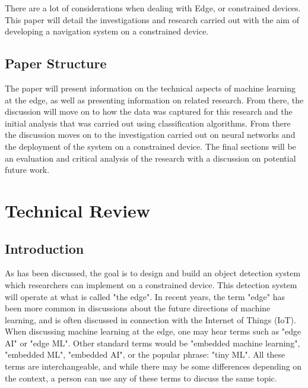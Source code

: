 \documentclass[conference]{IEEEtran}
\begin{document}
There are a lot of considerations when dealing with Edge, or constrained devices. This paper will detail the investigations and research carried out with the aim of developing a navigation system on a constrained device.

\subsection{Paper Structure}
The paper will present information on the technical aspects of machine learning at the edge, as well as presenting information on related research. From there, the discussion will move on to how the data was captured for this research and the initial analysis that was carried out using classification algorithms. From there the discussion moves on to the investigation carried out on neural networks and the deployment of the system on a constrained device. The final sections will be an evaluation and critical analysis of the research with a discussion on potential future work.

\section{Technical Review}
\subsection{Introduction}
As has been discussed, the goal is to design and build an object detection system which researchers can implement on a constrained device. This detection system will operate at what is called "the edge". In recent years, the term "edge" has been more common in discussions about the future directions of machine learning, and is often discussed in connection with the Internet of Things (IoT). When discussing machine learning at the edge, one may hear terms such as "edge AI" or "edge ML". Other standard terms would be "embedded machine learning", "embedded ML", "embedded AI", or the popular phrase: "tiny ML". All these terms are interchangeable, and while there may be some differences depending on the context, a person can use any of these terms to discuss the same topic.

\end{document}
